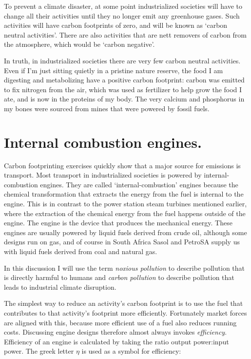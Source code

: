 To prevent a climate disaster, at some point industrialized societies will have
to change all their activities until they no longer emit any greenhouse gases.
Such activities will have carbon footprints of zero, and will be known as
`carbon neutral activities'. There are also activities that are nett removers of
carbon from the atmosphere, which would be `carbon negative'.

In truth, in industrialized societies there are very few carbon neutral
activities. Even if I'm just sitting quietly in a pristine nature reserve, the
food I am digesting and metabolizing have a positive carbon footprint: carbon
was emitted to fix nitrogen from the air, which was used as fertilizer to help
grow the food I ate, and is now in the proteins of my body. The very calcium and
phosphorus in my bones were sourced from mines that were powered by fossil
fuels. 

\section{Internal combustion engines.}

Carbon footprinting exercises quickly show that a major source for emissions is
transport. Most transport in industrialized societies is powered by
internal\hyp{}combustion engines. They are called `internal\hyp{}combustion' engines
because the chemical transformation that extracts the energy from the fuel is
internal to the engine. This is in contrast to the power station steam turbines
mentioned earlier, where the extraction of the chemical energy from the fuel
happens outside of the engine. The engine is the device that produces the
mechanical energy. These engines are usually powered by liquid fuels derived
from crude oil, although some designs run on gas, and of course in South Africa
Sasol and PetroSA supply us with liquid fuels derived from coal and natural gas.

In this discussion I will use the term \textit{noxious pollution} to describe
pollution that is directly harmful to humans and \textit{carbon pollution} to
describe pollution that leads to industrial climate disruption. 

The simplest way to reduce an activity's carbon footprint is to use the fuel
that contributes to that activity's footprint more efficiently. Fortunately
market forces are aligned with this, because more efficient use of a fuel also
reduces running costs. Discussing engine designs therefore almost always invokes
\textit{efficiency}. Efficiency of an engine is calculated by taking the ratio
output power:input power. The greek letter $\eta$ is used as a symbol for
efficiency:

